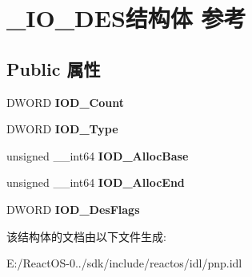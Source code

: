 \hypertarget{struct___i_o___d_e_s}{}\section{\+\_\+\+I\+O\+\_\+\+D\+E\+S结构体 参考}
\label{struct___i_o___d_e_s}
\subsection*{Public 属性}
\begin{DoxyCompactItemize}
\item 
\mbox{\label{struct___i_o___d_e_s_a7ae6ffe37b54e610d001879bc14c0fe6}} 
D\+W\+O\+RD {\bfseries I\+O\+D\+\_\+\+Count}
\item 
\mbox{\label{struct___i_o___d_e_s_aa4c66895c145fb4e1a1a85226d3fd543}} 
D\+W\+O\+RD {\bfseries I\+O\+D\+\_\+\+Type}
\item 
\mbox{\label{struct___i_o___d_e_s_a708896819f6c19be0398f3dfe9059634}} 
unsigned \+\_\+\+\_\+int64 {\bfseries I\+O\+D\+\_\+\+Alloc\+Base}
\item 
\mbox{\label{struct___i_o___d_e_s_a57ce2a7276a92eacec9079abc5eee289}} 
unsigned \+\_\+\+\_\+int64 {\bfseries I\+O\+D\+\_\+\+Alloc\+End}
\item 
\mbox{\label{struct___i_o___d_e_s_ac29c17caa4f5a4ffe9416e437c3191a4}} 
D\+W\+O\+RD {\bfseries I\+O\+D\+\_\+\+Des\+Flags}
\end{DoxyCompactItemize}


该结构体的文档由以下文件生成\+:\begin{DoxyCompactItemize}
\item 
E\+:/\+React\+O\+S-\/0../sdk/include/reactos/idl/pnp.\+idl\end{DoxyCompactItemize}
